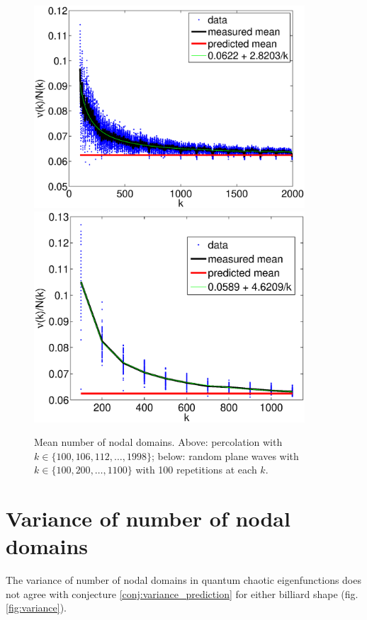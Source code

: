 \documentclass{report}
\begin{document}
\begin{figure}
  \begin{center}
    \includegraphics[width=0.9\textwidth]{figs/results/perc_100_to_2000_mean.eps}
    \includegraphics[width=0.9\textwidth]{figs/results/rpw_all_mean.eps}
    \caption{Mean number of nodal domains. Above: percolation with $k \in \{100, 106, 112, \ldots, 1998\}$; below: random plane waves with $k \in \{100, 200, \ldots, 1100\}$ with 100 repetitions at each $k$.}
  \end{center}
\end{figure}

\section{Variance of number of nodal domains}
The variance of number of nodal domains in quantum chaotic eigenfunctions does not agree with conjecture \ref{conj:variance_prediction} for either billiard shape (fig. \ref{fig:variance}).
\end{document}
